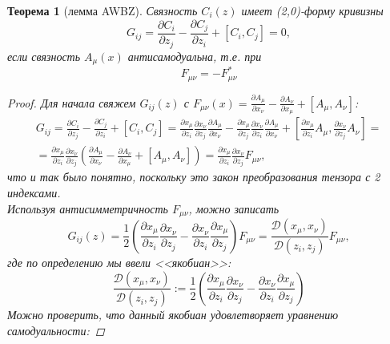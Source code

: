 \documentclass[12pt]{article}
\newtheorem{theorem}{Теорема}[section]
\theoremstyle{definition}
\begin{document}
\begin{theorem}[лемма AWBZ]
    Связность $C_i(z)$ имеет (2,0)-форму кривизны
    \begin{equation}
        G_{ij}=\frac{\partial C_i}{\partial z_j}-\frac{\partial C_j}{\partial z_i}+[C_i,C_j]=0,
    \end{equation}
    если связность $A_\mu(x)$ антисамодуальна, т.е. при
    \begin{equation}
        F_{\mu\nu}=-F^*_{\mu\nu}
    \end{equation}
    \begin{proof}
        Для начала свяжем $G_{ij}(z)$ с $F_{\mu\nu}(x)=\frac{\partial A_\mu}{\partial x_\nu}-\frac{\partial A_\nu}{\partial x_\mu}+[A_\mu,A_\nu]$:
        \begin{multline}
            G_{ij}=\frac{\partial C_i}{\partial z_j}-\frac{\partial C_j}{\partial z_i}+[C_i,C_j]=\frac{\partial x_\mu}{\partial z_i}\frac{\partial x_\nu}{\partial z_j}\frac{\partial A_\mu}{\partial x_\nu}-\frac{\partial x_\mu}{\partial z_j}\frac{\partial x_\nu}{\partial z_i}\frac{\partial A_\mu}{\partial x_\nu}+\left[\frac{\partial x_\mu}{\partial z_i}A_\mu,\frac{\partial x_\nu}{\partial z_j}A_\nu\right]=\\=\frac{\partial x_\mu}{\partial z_i}\frac{\partial x_\nu}{\partial z_j}\left(\frac{\partial A_\mu}{\partial x_\nu}-\frac{\partial A_\nu}{\partial x_\mu}+[A_\mu,A_\nu]\right)=\frac{\partial x_\mu}{\partial z_i}\frac{\partial x_\nu}{\partial z_j}F_{\mu\nu},
        \end{multline}
        что и так было понятно, поскольку это закон преобразования тензора с 2 индексами.\\
        Используя антисимметричность $F_{\mu\nu}$, можно записать
        \begin{equation}
            G_{ij}(z)=\frac{1}{2}\left(\frac{\partial x_\mu}{\partial z_i}\frac{\partial x_\nu}{\partial z_j}-\frac{\partial x_\nu}{\partial z_i}\frac{\partial x_\mu}{\partial z_j}\right)F_{\mu\nu}=\frac{\mathcal{D}(x_\mu,x_\nu)}{\mathcal{D}(z_i,z_j)}F_{\mu\nu},
        \end{equation}
        где по определению мы ввели <<якобиан>>:
        \begin{equation}
            \frac{\mathcal{D}(x_\mu,x_\nu)}{\mathcal{D}(z_i,z_j)}:=\frac{1}{2}\left(\frac{\partial x_\mu}{\partial z_i}\frac{\partial x_\nu}{\partial z_j}-\frac{\partial x_\nu}{\partial z_i}\frac{\partial x_\mu}{\partial z_j}\right)
        \end{equation}
        Можно проверить, что данный якобиан удовлетворяет уравнению самодуальности:

\end{proof}
\end{theorem}
\end{document}
